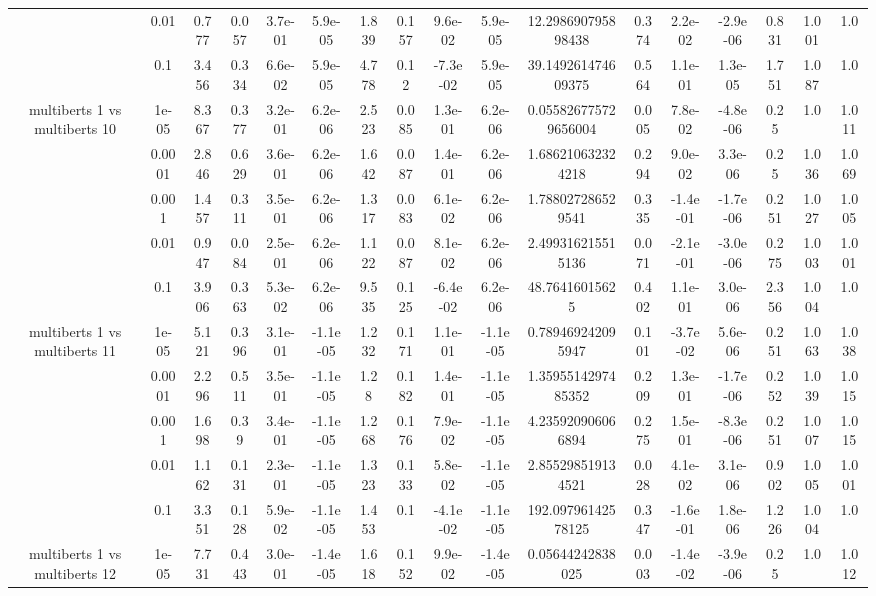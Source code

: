 \begin{tabular}{|c|c|c|c|c|c|c|c|c|c|c|c|c|c|c|c|c|}
 & 0.01 & 0.777 & 0.057 & 3.7e-01 & 5.9e-05 & 1.839 & 0.157 & 9.6e-02 & 5.9e-05 & 12.298690795898438 & 0.374 & 2.2e-02 & -2.9e-06 & 0.831 & 1.001 & 1.0 \\
 & 0.1 & 3.456 & 0.334 & 6.6e-02 & 5.9e-05 & 4.778 & 0.12 & -7.3e-02 & 5.9e-05 & 39.149261474609375 & 0.564 & 1.1e-01 & 1.3e-05 & 1.751 & 1.087 & 1.0 \\
\hline
\multirow{5}{*}{multiberts 1 vs multiberts 10} & 1e-05 & 8.367 & 0.377 & 3.2e-01 & 6.2e-06 & 2.523 & 0.085 & 1.3e-01 & 6.2e-06 & 0.055826775729656004 & 0.005 & 7.8e-02 & -4.8e-06 & 0.25 & 1.0 & 1.011 \\
 & 0.0001 & 2.846 & 0.629 & 3.6e-01 & 6.2e-06 & 1.642 & 0.087 & 1.4e-01 & 6.2e-06 & 1.686210632324218 & 0.294 & 9.0e-02 & 3.3e-06 & 0.25 & 1.036 & 1.069 \\
 & 0.001 & 1.457 & 0.311 & 3.5e-01 & 6.2e-06 & 1.317 & 0.083 & 6.1e-02 & 6.2e-06 & 1.788027286529541 & 0.335 & -1.4e-01 & -1.7e-06 & 0.251 & 1.027 & 1.005 \\
 & 0.01 & 0.947 & 0.084 & 2.5e-01 & 6.2e-06 & 1.122 & 0.087 & 8.1e-02 & 6.2e-06 & 2.499316215515136 & 0.071 & -2.1e-01 & -3.0e-06 & 0.275 & 1.003 & 1.001 \\
 & 0.1 & 3.906 & 0.363 & 5.3e-02 & 6.2e-06 & 9.535 & 0.125 & -6.4e-02 & 6.2e-06 & 48.76416015625 & 0.402 & 1.1e-01 & 3.0e-06 & 2.356 & 1.004 & 1.0 \\
\hline
\multirow{5}{*}{multiberts 1 vs multiberts 11} & 1e-05 & 5.121 & 0.396 & 3.1e-01 & -1.1e-05 & 1.232 & 0.171 & 1.1e-01 & -1.1e-05 & 0.789469242095947 & 0.101 & -3.7e-02 & 5.6e-06 & 0.251 & 1.063 & 1.038 \\
 & 0.0001 & 2.296 & 0.511 & 3.5e-01 & -1.1e-05 & 1.28 & 0.182 & 1.4e-01 & -1.1e-05 & 1.3595514297485352 & 0.209 & 1.3e-01 & -1.7e-06 & 0.252 & 1.039 & 1.015 \\
 & 0.001 & 1.698 & 0.39 & 3.4e-01 & -1.1e-05 & 1.268 & 0.176 & 7.9e-02 & -1.1e-05 & 4.235920906066894 & 0.275 & 1.5e-01 & -8.3e-06 & 0.251 & 1.007 & 1.015 \\
 & 0.01 & 1.162 & 0.131 & 2.3e-01 & -1.1e-05 & 1.323 & 0.133 & 5.8e-02 & -1.1e-05 & 2.855298519134521 & 0.028 & 4.1e-02 & 3.1e-06 & 0.902 & 1.005 & 1.001 \\
 & 0.1 & 3.351 & 0.128 & 5.9e-02 & -1.1e-05 & 1.453 & 0.1 & -4.1e-02 & -1.1e-05 & 192.09796142578125 & 0.347 & -1.6e-01 & 1.8e-06 & 1.226 & 1.004 & 1.0 \\
\hline
\multirow{5}{*}{multiberts 1 vs multiberts 12} & 1e-05 & 7.731 & 0.443 & 3.0e-01 & -1.4e-05 & 1.618 & 0.152 & 9.9e-02 & -1.4e-05 & 0.05644242838025 & 0.003 & -1.4e-02 & -3.9e-06 & 0.25 & 1.0 & 1.012 \\

\end{tabular}
